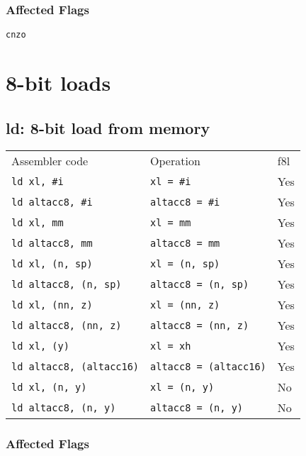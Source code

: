 \documentclass{book}
\begin{document}
\subsubsection*{Affected Flags}

\texttt{cnzo}


\section{8-bit loads}

\subsection{ld: 8-bit load from memory}

\begin{tabular}{l l l}
Assembler code                  & Operation                     & f8l \\
\texttt{ld xl, \#i}             & \texttt{xl = \#i}             & Yes \\
\texttt{ld altacc8, \#i}        & \texttt{altacc8 = \#i}        & Yes \\
\texttt{ld xl, mm}              & \texttt{xl = mm}              & Yes \\
\texttt{ld altacc8, mm}         & \texttt{altacc8 = mm}         & Yes \\
\texttt{ld xl, (n, sp)}         & \texttt{xl = (n, sp)}         & Yes \\
\texttt{ld altacc8, (n, sp)}    & \texttt{altacc8 = (n, sp)}    & Yes \\
\texttt{ld xl, (nn, z)}         & \texttt{xl = (nn, z)}         & Yes \\
\texttt{ld altacc8, (nn, z)}    & \texttt{altacc8 = (nn, z)}    & Yes \\
\texttt{ld xl, (y)}             & \texttt{xl = xh}              & Yes \\
\texttt{ld altacc8, (altacc16)} & \texttt{altacc8 = (altacc16)} & Yes \\
\texttt{ld xl, (n, y)}          & \texttt{xl = (n, y)}          & No \\
\texttt{ld altacc8, (n, y)}     & \texttt{altacc8 = (n, y)}     & No \\
\end{tabular}

\subsubsection*{Affected Flags}
\end{document}
